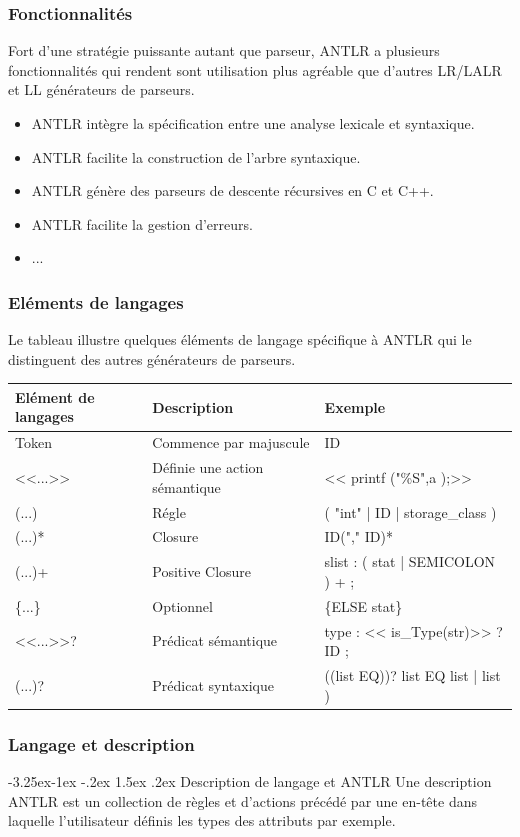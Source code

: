 \documentclass{article}
\makeatletter
\newcounter {subsubsubsection}[subsubsection]
\newcommand\subsubsubsection{\@startsection{subsubsubsection}{4}{\z@}%
                                     {-3.25ex\@plus -1ex \@minus -.2ex}%
                                     {1.5ex \@plus .2ex}%
                                     {\normalfont\normalsize\bfseries}}
\makeatother
\begin{document}
\subsubsection{Fonctionnalités}
Fort d’une stratégie puissante autant que parseur, ANTLR a plusieurs fonctionnalités qui rendent sont utilisation plus agréable que d’autres LR/LALR et LL générateurs de parseurs.
\begin{itemize}
\item ANTLR  intègre la spécification entre une analyse lexicale et syntaxique.
			\item ANTLR facilite la construction de l’arbre syntaxique.
			\item ANTLR génère des parseurs de descente récursives en C et C++.
			\item ANTLR   facilite la gestion d’erreurs.
			\item ...
\end{itemize}

\subsubsection{Eléments de langages}
Le tableau illustre quelques éléments de langage spécifique à ANTLR qui le distinguent des autres générateurs de parseurs.
\newline

\begin{tabular}{|l|l|l|}
\hline
Elément de langages & Description & Exemple \\
\hline
Token & Commence par majuscule & ID \\
\hline
<<...>> & Définie une action sémantique & << printf ("\%S",a );>> \\
\hline	
(...) & Régle & ( "int" | ID  | storage\_class ) \\
\hline
(...)* & Closure & ID("," ID)* \\
\hline
(...)+ & Positive Closure & slist : ( stat | SEMICOLON ) + ; \\
\hline
\{...\} & Optionnel & \{ELSE stat\} \\
\hline
<<...>>? & Prédicat sémantique & type : << is\_Type(str)>> ? ID ; \\
\hline
(...)? & Prédicat syntaxique & ((list EQ))? list EQ list | list ) \\
\hline
\end{tabular}
\subsubsection{Langage et description}
\subsubsubsection{Description de langage et ANTLR}
Une description ANTLR est un collection de règles et d'actions précédé par une en-tête dans laquelle l'utilisateur définis les types des attributs par exemple.
\end{document}
